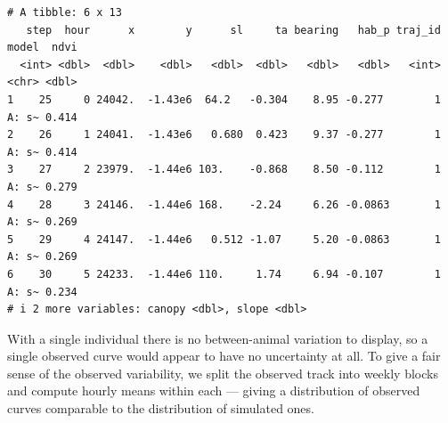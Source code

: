 \documentclass[
  letterpaper,
  DIV=11,
  numbers=noendperiod]{scrartcl}
\begin{document}
\begin{verbatim}
# A tibble: 6 x 13
   step  hour      x        y      sl     ta bearing   hab_p traj_id model  ndvi
  <int> <dbl>  <dbl>    <dbl>   <dbl>  <dbl>   <dbl>   <dbl>   <int> <chr> <dbl>
1    25     0 24042.  -1.43e6  64.2   -0.304    8.95 -0.277        1 A: s~ 0.414
2    26     1 24041.  -1.43e6   0.680  0.423    9.37 -0.277        1 A: s~ 0.414
3    27     2 23979.  -1.44e6 103.    -0.868    8.50 -0.112        1 A: s~ 0.279
4    28     3 24146.  -1.44e6 168.    -2.24     6.26 -0.0863       1 A: s~ 0.269
5    29     4 24147.  -1.44e6   0.512 -1.07     5.20 -0.0863       1 A: s~ 0.269
6    30     5 24233.  -1.44e6 110.     1.74     6.94 -0.107        1 A: s~ 0.234
# i 2 more variables: canopy <dbl>, slope <dbl>
\end{verbatim}

With a single individual there is no between-animal variation to
display, so a single observed curve would appear to have no uncertainty
at all. To give a fair sense of the observed variability, we split the
observed track into weekly blocks and compute hourly means within each
--- giving a distribution of observed curves comparable to the
distribution of simulated ones.
\end{document}
